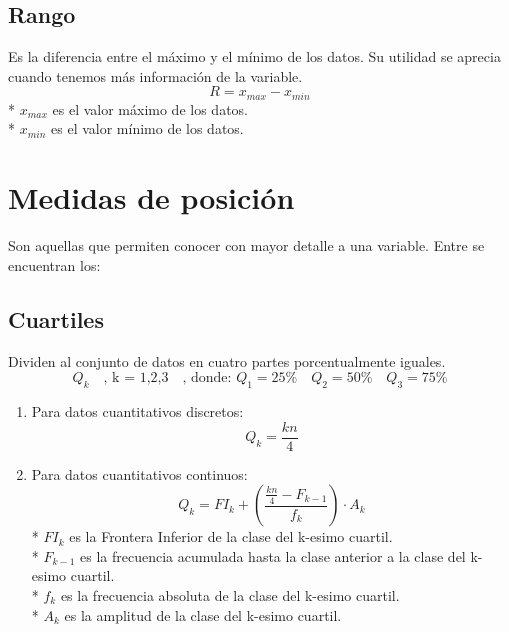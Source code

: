 \documentclass{templateNote}
\begin{document}
\subsection{Rango}
\indent
Es la diferencia entre el máximo y el mínimo de
los datos. Su utilidad se aprecia cuando
tenemos más información de la variable. 
\begin{equation*}
    R = x_{max} - x_{min}
\end{equation*}
* $x_{max}$ es el valor máximo de los datos.\\
* $x_{min}$ es el valor mínimo de los datos.\\

\section{Medidas de posición}
\indent
Son aquellas que permiten conocer con mayor detalle a una variable. Entre se encuentran
los:
\subsection{Cuartiles}
Dividen al conjunto de datos en cuatro partes porcentualmente iguales.
\[
    Q_k \quad \text{, k = 1,2,3} \quad
    \text{, donde: } Q_1 = 25\% \quad Q_2 = 50\% \quad Q_3 = 75\%
\]
\begin{enumerate}
    \item Para datos cuantitativos discretos:
    \begin{equation*}
        Q_k = \frac{kn}{4}
    \end{equation*}
    \item Para datos cuantitativos continuos:
    \begin{equation*}
        Q_k = FI_k + \left(\frac{\displaystyle \frac{kn}{4} - F_{k-1}}{f_k}\right) \cdot A_k
    \end{equation*}
    * $FI_k$ es la Frontera Inferior de la clase del k-esimo cuartil.\\
    * $F_{k-1}$ es la frecuencia acumulada hasta la clase anterior a la clase del k-esimo cuartil. \\
    * $f_k$ es la frecuencia absoluta de la clase del k-esimo cuartil.\\
    * $A_k$ es la amplitud de la clase del k-esimo cuartil.\\
\end{enumerate}

\newpage
\end{document}
